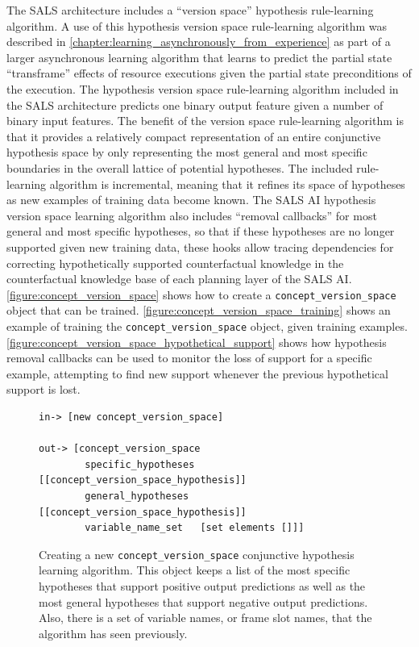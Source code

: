 The SALS architecture includes a ``version space''
\cite[]{mitchell:1997} hypothesis rule-learning algorithm.  A use of
this hypothesis version space rule-learning algorithm was described in
{\mbox{\autoref{chapter:learning_asynchronously_from_experience}}} as
part of a larger asynchronous learning algorithm that learns to
predict the partial state ``transframe'' \cite[]{minsky:1975} effects
of resource executions given the partial state preconditions of the
execution.  The hypothesis version space rule-learning algorithm
included in the SALS architecture predicts one binary output feature
given a number of binary input features.  The benefit of the version
space rule-learning algorithm is that it provides a relatively compact
representation of an entire conjunctive hypothesis space by only
representing the most general and most specific boundaries in the
overall lattice of potential hypotheses.  The included rule-learning
algorithm is incremental, meaning that it refines its space of
hypotheses as new examples of training data become known.  The SALS AI
hypothesis version space learning algorithm also includes ``removal
callbacks'' for most general and most specific hypotheses, so that if
these hypotheses are no longer supported given new training data,
these hooks allow tracing dependencies for correcting hypothetically
supported counterfactual knowledge in the counterfactual knowledge
base of each planning layer of the SALS AI.
{\mbox{\autoref{figure:concept_version_space}}} shows how to create a
{\tt{concept\_version\_space}} object that can be trained.
{\mbox{\autoref{figure:concept_version_space_training}}} shows an
example of training the {\tt{concept\_version\_space}} object, given
training examples.
{\mbox{\autoref{figure:concept_version_space_hypothetical_support}}}
shows how hypothesis removal callbacks can be used to monitor the loss
of support for a specific example, attempting to find new support
whenever the previous hypothetical support is lost.
\begin{figure}[h]
\centering
{\scriptsize
\begin{Verbatim}[frame=single]
 in-> [new concept_version_space]

out-> [concept_version_space
        specific_hypotheses [[concept_version_space_hypothesis]]
        general_hypotheses  [[concept_version_space_hypothesis]]
        variable_name_set   [set elements []]]
\end{Verbatim}
}
\caption[Creating a new {\tt{concept\_version\_space}} conjunctive
  hypothesis learning algorithm.]{Creating a new
  {\tt{concept\_version\_space}} conjunctive hypothesis learning
  algorithm.  This object keeps a list of the most specific hypotheses
  that support positive output predictions as well as the most general
  hypotheses that support negative output predictions.  Also, there is
  a set of variable names, or frame slot names, that the algorithm has
  seen previously.}
\label{figure:concept_version_space}
\end{figure}
